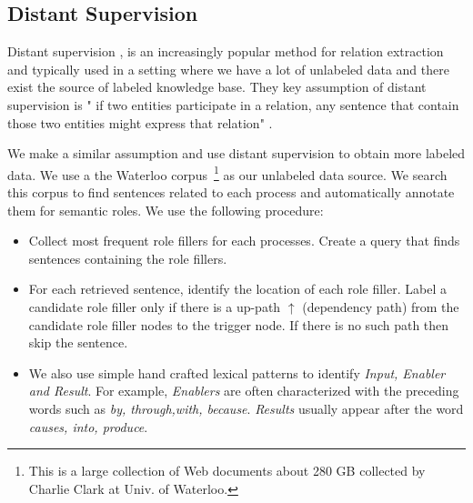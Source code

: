 
\subsection{Distant Supervision}
Distant supervision \cite{mintz2009distant},  is an increasingly popular method for relation extraction and typically used in a setting where we have a lot  of unlabeled data and there exist the source of  labeled knowledge base.
They key assumption of distant supervision is " if two entities participate in a relation, any sentence that contain those two entities might express that relation" \cite{mintz2009distant}. 

We make a similar assumption and use distant supervision to obtain more labeled data. We use a the Waterloo corpus~\footnote{This is a large collection of Web documents about 280 GB collected by Charlie Clark at Univ. of Waterloo.} as our unlabeled data source. We search this corpus to find sentences related to each process and automatically annotate them for semantic roles. We use the following procedure:
\begin{itemize}[noitemsep,nolistsep]
\item Collect most frequent role fillers for each processes.  Create a query that finds sentences containing the role fillers.
\item  For each retrieved sentence, identify the location of each role filler. 
Label a candidate role filler only if there is a up-path $\uparrow$ (dependency path) from the candidate role filler nodes to the trigger node. 
If there is no such path then skip the sentence.
\item We also use simple hand crafted  lexical patterns to identify \textit{Input, Enabler and Result}. For example, \textit{Enablers} are often characterized with the preceding words such as \textit{by, through,with, because}. \textit{Results} usually appear after the word \textit{causes, into, produce}. 
\end{itemize}